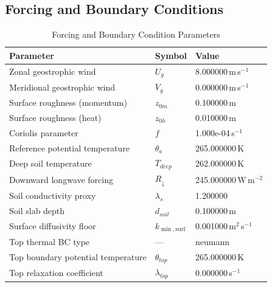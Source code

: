 \subsection{Forcing and Boundary Conditions}
\begin{table}[htbp]
\centering
\caption{Forcing and Boundary Condition Parameters}
\label{tab:scm_parameters_gabls1_gabls1_80x2m_9h_report}
\begin{tabular}{lll}
\hline
{\bfseries Parameter} & {\bfseries Symbol} & {\bfseries Value} \\
\hline
Zonal geostrophic wind & $U_g$ & 8.000000\,m\,s$^{-1}$ \\
Meridional geostrophic wind & $V_g$ & 0.000000\,m\,s$^{-1}$ \\
Surface roughness (momentum) & $z_{0m}$ & 0.100000\,m \\
Surface roughness (heat) & $z_{0h}$ & 0.010000\,m \\
Coriolis parameter & $f$ & 1.000e-04\,s$^{-1}$ \\
Reference potential temperature & $\theta_a$ & 265.000000\,K \\
Deep soil temperature & $T_{deep}$ & 262.000000\,K \\
Downward longwave forcing & $R_{\downarrow}$ & 245.000000\,W\,m$^{-2}$ \\
Soil conductivity proxy & $\lambda_s$ & 1.200000 \\
Soil slab depth & $d_{soil}$ & 0.100000\,m \\
Surface diffusivity floor & $k_{\min,\mathrm{surf}}$ & 0.001000\,m$^2$\,s$^{-1}$ \\
Top thermal BC type & --- & neumann \\
Top boundary potential temperature & $\theta_{top}$ & 265.000000\,K \\
Top relaxation coefficient & $\lambda_{top}$ & 0.000000\,s$^{-1}$ \\
\hline
\end{tabular}
\end{table}

